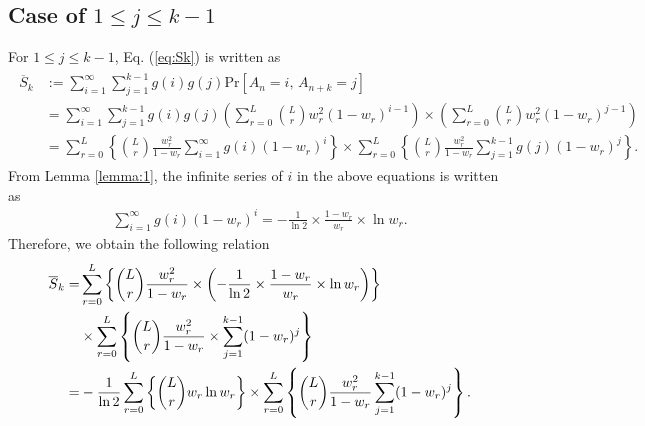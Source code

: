 \subsection{Case of $1 \leq j \leq k-1$}
For $1 \leq j \leq k-1$, Eq. (\ref{eq:Sk}) is written as
\begin{align}\begin{split}
  \overline{S}_{k} 
  &:= \sum_{i=1}^{\infty} \sum_{j=1}^{k-1} g(i) g(j) \mathrm{Pr} \left[ A_n=i,\,A_{n+k}=j \right] \\
  &= \sum_{i=1}^{\infty} \sum_{j=1}^{k-1} g(i) g(j) \left( \sum_{r=0}^{L} \binom{L}{r}w_r^2 (1-w_r)^{i-1} \right) \times \left( \sum_{r=0}^{L} \binom{L}{r}w_r^2 (1-w_r)^{j-1} \right) \\ 
  &= \sum_{r=0}^{L} \left\{\binom{L}{r} \frac{w_r^2}{1-w_r} \sum_{i=1}^{\infty} g(i)(1-w_r)^{i} \right\}
  \times \sum_{r=0}^{L} \left\{ \binom{L}{r} \frac{w_r^2}{1-w_r} \sum_{j=1}^{k-1} g(j)(1-w_r)^{j} \right\}.
\end{split}\end{align}
From Lemma \ref{lemma:1}, the infinite series of $i$ in the above equations is written as
\begin{align}
	\sum_{i=1}^{\infty} g(i) (1 - w_r)^{i} = - \frac{1}{\ln 2} \times \frac{1-w_r}{w_r}\times\ln w_r.
\end{align}
%
Therefore, we obtain the following relation
\begin{align}\begin{split}
  \overline{S}_{k}
  =& \sum_{r=0}^{L} \left\{ \dbinom{L}{r} \frac{w_r^2}{1-w_r}  \times \left(- \frac{1}{\ln 2} \times \frac{1-w_r}{w_r}\times\ln w_r \right) \right\} \\
  &\times \sum_{r=0}^{L} \left\{ \dbinom{L}{r} \frac{w_r^2}{1-w_r} \times \sum_{j=1}^{k-1} (1-w_r)^{j} \right\} \\
  =&-\frac{1}{\ln 2}\sum_{r=0}^{L} \left\{ \dbinom{L}{r} w_r \ln w_r \right\} \times \sum_{r=0}^{L} \left\{ \dbinom{L}{r} \frac{w_r^2}{1-w_r} \sum_{j=1}^{k-1} (1-w_r)^{j} \right\}.
\end{split}\end{align}
%
